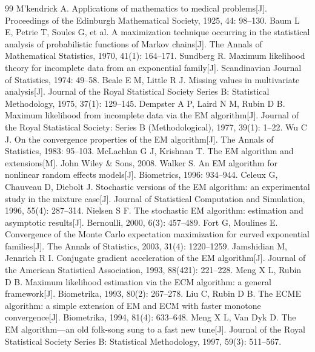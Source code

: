 \documentclass[12pt,a4paper]{ctexart}
\numberwithin{figure}{section}
\numberwithin{table}{section}
\begin{document}
{}
\begin{thebibliography}{99}
   M'kendrick A. Applications of mathematics to medical problems[J]. Proceedings of the Edinburgh Mathematical Society, 1925, 44: 98--130.
   Baum L E, Petrie T, Soules G, et al. A maximization technique occurring in the statistical analysis of probabilistic functions of Markov chains[J]. The Annals of Mathematical Statistics, 1970, 41(1): 164--171.
   Sundberg R. Maximum likelihood theory for incomplete data from an exponential family[J]. Scandinavian Journal of Statistics, 1974: 49--58.
   Beale E M, Little R J. Missing values in multivariate analysis[J]. Journal of the Royal Statistical Society Series B: Statistical Methodology, 1975, 37(1): 129--145.
   Dempster A P, Laird N M, Rubin D B. Maximum likelihood from incomplete data via the EM algorithm[J]. Journal of the Royal Statistical Society: Series B (Methodological), 1977, 39(1): 1--22.
   Wu C J. On the convergence properties of the EM algorithm[J]. The Annals of Statistics, 1983: 95--103.
   McLachlan G J, Krishnan T. The EM algorithm and extensions[M]. John Wiley \& Sons, 2008.
   Walker S. An EM algorithm for nonlinear random effects models[J]. Biometrics, 1996: 934--944.
   Celeux G, Chauveau D, Diebolt J. Stochastic versions of the EM algorithm: an experimental study in the mixture case[J]. Journal of Statistical Computation and Simulation, 1996, 55(4): 287--314.
   Nielsen S F. The stochastic EM algorithm: estimation and asymptotic results[J]. Bernoulli, 2000, 6(3): 457--489.
   Fort G, Moulines E. Convergence of the Monte Carlo expectation maximization for curved exponential families[J]. The Annals of Statistics, 2003, 31(4): 1220--1259.
   Jamshidian M, Jennrich R I. Conjugate gradient acceleration of the EM algorithm[J]. Journal of the American Statistical Association, 1993, 88(421): 221--228.
   Meng X L, Rubin D B. Maximum likelihood estimation via the ECM algorithm: a general framework[J]. Biometrika, 1993, 80(2): 267--278.
   Liu C, Rubin D B. The ECME algorithm: a simple extension of EM and ECM with faster monotone convergence[J]. Biometrika, 1994, 81(4): 633--648.
   Meng X L, Van Dyk D. The EM algorithm---an old folk-song sung to a fast new tune[J]. Journal of the Royal Statistical Society Series B: Statistical Methodology, 1997, 59(3): 511--567.

\end{thebibliography}
\end{document}
